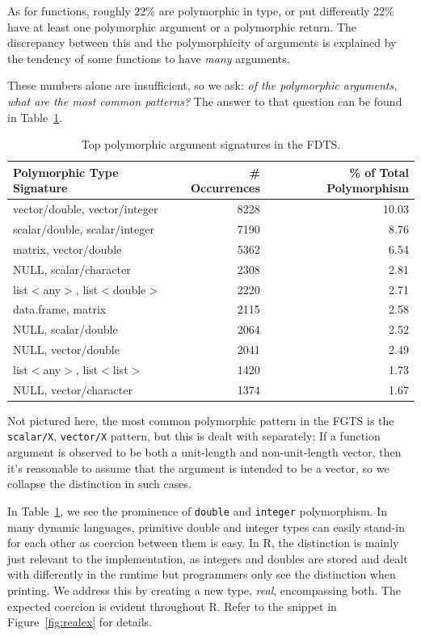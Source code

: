 \documentclass[acmsmall,10pt,review,anonymous]{acmart}\settopmatter{printfolios=true,printccs=false,printacmref=false}
\begin{document}
As for functions, roughly 22\% are polymorphic in type, or put differently 22\% have at least one polymorphic argument or a polymorphic return.
The discrepancy between this and the polymorphicity of arguments is explained by the tendency of some functions to have {\it many} arguments.

These numbers alone are insufficient, so we ask: {\it of the polymorphic arguments, what are the most common patterns?}
The answer to that question can be found in Table~\ref{tab:toppolyFDTS}.

\begin{table}[ht]
\label{tab:toppolyFDTS}
\centering
\begin{tabular}{lrr}
  \hline
 Polymorphic Type Signature & \# Occurrences & \% of Total Polymorphism \\ 
  \hline
  vector/double, vector/integer & 8228 & 10.03 \\ 
  scalar/double, scalar/integer & 7190 & 8.76 \\ 
  matrix, vector/double & 5362 & 6.54 \\ 
  NULL, scalar/character & 2308 & 2.81 \\ 
  list$<$any$>$, list$<$double$>$ & 2220 & 2.71 \\ 
  data.frame, matrix & 2115 & 2.58 \\ 
  NULL, scalar/double & 2064 & 2.52 \\ 
  NULL, vector/double & 2041 & 2.49 \\ 
  list$<$any$>$, list$<$list$>$ & 1420 & 1.73 \\ 
  NULL, vector/character & 1374 & 1.67 \\ 
     \hline
\end{tabular}
\caption{Top polymorphic argument signatures in the FDTS.}
\end{table}

Not pictured here, the most common polymorphic pattern in the FGTS is the {\tt scalar/X}, {\tt vector/X} pattern, but this is dealt with separately:
If a function argument is observed to be both a unit-length and non-unit-length vector, then it's reasonable to assume that the argument is intended to be a vector, so we collapse the distinction in such cases.

In Table~\ref{tab:toppolyFDTS}, we see the prominence of {\tt double} and {\tt integer} polymorphism.
In many dynamic languages, primitive double and integer types can easily stand-in for each other as coercion between them is easy.
In R, the distinction is mainly just relevant to the implementation, as integers and doubles are stored and dealt with differently in the runtime but programmers only see the distinction when printing.
We address this by creating a new type, {\it real}, encompassing both.
The expected coercion is evident throughout R.
Refer to the snippet in Figure~\ref{fig:realex} for details.
\end{document}
